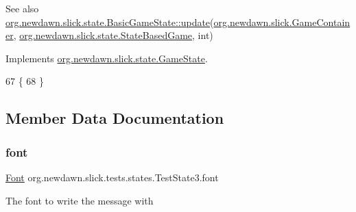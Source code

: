 \begin{DoxySeeAlso}{See also}
\mbox{\hyperlink{interfaceorg_1_1newdawn_1_1slick_1_1state_1_1_game_state_ab5ec3bc37a9bd1eb5679577408c562c1}{org.\+newdawn.\+slick.\+state.\+Basic\+Game\+State\+::update}}(\mbox{\hyperlink{classorg_1_1newdawn_1_1slick_1_1_game_container}{org.\+newdawn.\+slick.\+Game\+Container}}, \mbox{\hyperlink{classorg_1_1newdawn_1_1slick_1_1state_1_1_state_based_game}{org.\+newdawn.\+slick.\+state.\+State\+Based\+Game}}, int) 
\end{DoxySeeAlso}


Implements \mbox{\hyperlink{interfaceorg_1_1newdawn_1_1slick_1_1state_1_1_game_state_ab5ec3bc37a9bd1eb5679577408c562c1}{org.\+newdawn.\+slick.\+state.\+Game\+State}}.


\begin{DoxyCode}
67                                                                                 \{
68     \}
\end{DoxyCode}


\subsection{Member Data Documentation}
\mbox{\label{classorg_1_1newdawn_1_1slick_1_1tests_1_1states_1_1_test_state3_a7e7969f51b4cab9b70539243e13703f0}} 
\subsubsection{\texorpdfstring{font}{font}}
{\footnotesize\ttfamily \mbox{\hyperlink{interfaceorg_1_1newdawn_1_1slick_1_1_font}{Font}} org.\+newdawn.\+slick.\+tests.\+states.\+Test\+State3.\+font\hspace{0.3cm}{\ttfamily [private]}}

The font to write the message with \mbox{\label{classorg_1_1newdawn_1_1slick_1_1tests_1_1states_1_1_test_state3_a769f07538782627db0be9ce0043b356f}} 
